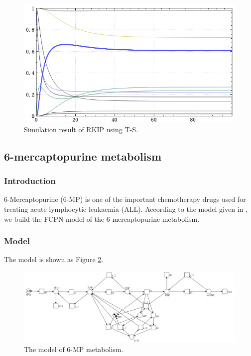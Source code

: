 \documentclass[journal,a4paper,onecolumn]{article}
\begin{document}
\begin{figure}[!hbt]
	\begin{center}
		\includegraphics[width=\columnwidth]{fig30}
		\caption{Simulation result of RKIP using T-S.}
		\label{fig:Simulation result of RKIP using T-S.}
	\end{center}
\end{figure}





\clearpage
\subsection{6-mercaptopurine metabolism}
\subsubsection{Introduction}
6-Mercaptopurine (6-MP) is one of the important chemotherapy drugs used for treating acute lymphocytic leukaemia (ALL). According to the model given in \cite{lavrova2017ordinary,lavrova2016ode}, we build the FCPN model of the 6-mercaptopurine metabolism.

\subsubsection{Model}
The model is shown as Figure \ref{fig:The model of 6-MP metabolism}.

\begin{figure}[!hbt]
	\begin{center}
		\includegraphics[width=\columnwidth]{fig53}
		\caption{The model of 6-MP metabolism.}
		\label{fig:The model of 6-MP metabolism}
	\end{center}
\end{figure}
\end{document}
